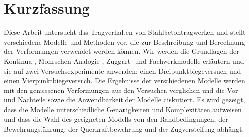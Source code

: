 \chapter*{Kurzfassung}

Diese Arbeit untersucht das Tragverhalten von Stahlbetontragwerken und stellt verschiedene Modelle und Methoden vor, die zur Beschreibung und Berechnung der Verformungen verwendet werden können. Wir werden die Grundlagen der Kontinua-, Mohrschen Analogie-, Zuggurt- und Fachwerkmodelle erläutern und sie auf zwei Versuchsexperimente anwenden: einen Dreipunktbiegeversuch und einen Vierpunktbiegeversuch. Die Ergebnisse der verschiedenen Modelle werden mit den gemessenen Verformungen aus den Versuchen verglichen und die Vor- und Nachteile sowie die Anwendbarkeit der Modelle diskutiert. Es wird gezeigt, dass die Modelle unterschiedliche Genauigkeiten und Komplexitäten aufweisen und dass die Wahl des geeigneten Modells von den Randbedingungen, der Bewehrungsführung, der Querkraftbewehrung und der Zugversteifung abhängt.
